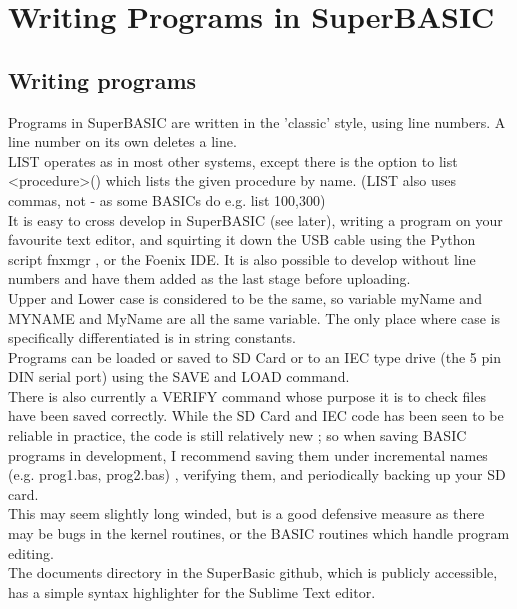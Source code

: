 \chapter{Writing Programs in SuperBASIC}

\section {Writing programs}
Programs in SuperBASIC are written in the 'classic' style, using line numbers. A line number on its own deletes a line.\\

LIST operates as in most other systems, except there is the option to list <procedure>() which lists the given procedure by name. (LIST also uses commas, not - as some BASICs do e.g. list 100,300)\\

It is easy to cross develop in SuperBASIC (see later), writing a program on your favourite text editor, and squirting it down the USB cable using the Python script fnxmgr , or the Foenix IDE. It is also possible to develop without line numbers and have them added as the last stage before uploading.\\

Upper and Lower case is considered to be the same, so variable myName and MYNAME and MyName are all the same variable. The only place where case is specifically differentiated is in string constants.\\

Programs can be loaded or saved to SD Card or to an IEC type drive (the 5 pin DIN serial port) using the SAVE and LOAD command.\\

There is also currently a VERIFY command whose purpose it is to check files have been saved correctly. While the SD Card and IEC code has been seen to be reliable in practice, the code is still relatively new ; so when saving BASIC programs in development, I recommend saving them under incremental names (e.g. prog1.bas, prog2.bas) , verifying them, and periodically backing up your SD card.\\

This may seem slightly long winded, but is a good defensive measure as there may be bugs in the kernel routines, or the BASIC routines which handle program editing. \\

The documents directory in the SuperBasic github, which is publicly accessible, has a simple syntax highlighter for the Sublime Text editor.\\